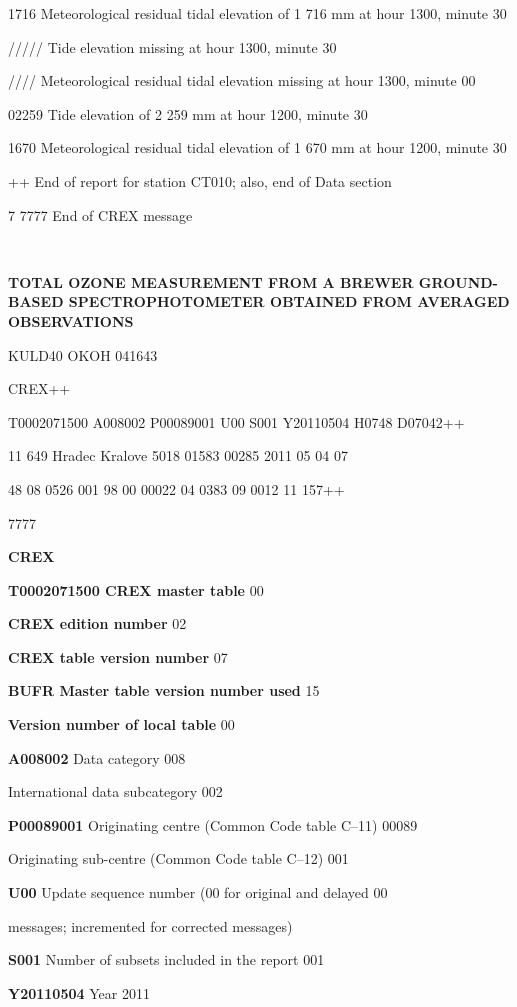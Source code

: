 1716 Meteorological residual tidal elevation of 1 716 mm at hour 1300, minute 30

///// Tide elevation missing at hour 1300, minute 30

//// Meteorological residual tidal elevation missing at hour 1300, minute 00

02259 Tide elevation of 2 259 mm at hour 1200, minute 30

1670 Meteorological residual tidal elevation of 1 670 mm at hour 1200, minute 30

++ End of report for station CT010; also, end of Data section

7 7777 End of CREX message

\emph{\textbf{\\
}}

\textbf{TOTAL OZONE MEASUREMENT FROM A BREWER GROUND-BASED SPECTROPHOTOMETER OBTAINED FROM AVERAGED OBSERVATIONS}

KULD40 OKOH 041643

CREX++

T0002071500 A008002 P00089001 U00 S001 Y20110504 H0748 D07042++

11 649 Hradec Kralove 5018 01583 00285 2011 05 04 07

48 08 0526 001 98 00 00022 04 0383 09 0012 11 157++

7777

\textbf{CREX}

\textbf{T0002071500 CREX master table} 00

\textbf{CREX edition number} 02

\textbf{CREX table version number} 07

\textbf{BUFR Master table version number used} 15

\textbf{Version number of local table} 00

\textbf{A008002} Data category 008

International data subcategory 002

\textbf{P00089001} Originating centre (Common Code table C--11) 00089

Originating sub-centre (Common Code table C--12) 001

\textbf{U00} Update sequence number (00 for original and delayed 00

messages; incremented for corrected messages)

\textbf{S001} Number of subsets included in the report 001

\textbf{Y20110504} Year 2011

